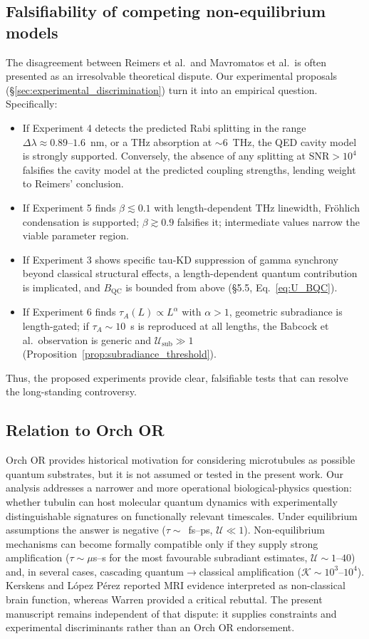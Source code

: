 \documentclass[twocolumn,10pt]{article}
\begin{document}
\subsection{Falsifiability of competing non-equilibrium models}
The disagreement between Reimers et al.\ and Mavromatos et al.\ is often
presented as an irresolvable theoretical dispute. Our experimental
proposals (\S\ref{sec:experimental_discrimination}) turn it into an empirical question.
Specifically:
\begin{itemize}
\item If Experiment 4 detects the predicted Rabi splitting in the
range $\Delta\lambda \approx 0.89\text{--}1.6$~nm, or a THz absorption at
$\sim 6$~THz, the QED cavity model is strongly supported. Conversely, the
absence of any splitting at SNR$>10^4$ falsifies the cavity model at the
predicted coupling strengths, lending weight to Reimers' conclusion.
\item If Experiment 5 finds $\beta\lesssim 0.1$ with length-dependent
THz linewidth, Fr\"ohlich condensation is supported; $\beta\gtrsim 0.9$
falsifies it; intermediate values narrow the viable parameter region.
\item If Experiment 3 shows specific tau-KD suppression of gamma
synchrony beyond classical structural effects, a length-dependent
quantum contribution is implicated, and $B_{\text{QC}}$ is bounded from
above (\S 5.5, Eq.~\ref{eq:U_BQC}).
\item If Experiment 6 finds $\tau_A(L) \propto L^\alpha$ with $\alpha>1$,
geometric subradiance is length-gated; if $\tau_A \sim 10$~s is reproduced
at all lengths, the Babcock et al.\ observation is generic and
$\mathcal{U}_{\text{sub}} \gg 1$ (Proposition~\ref{prop:subradiance_threshold}).
\end{itemize}
Thus, the proposed experiments provide clear, falsifiable tests that
can resolve the long-standing controversy.

\subsection{Relation to Orch OR}
Orch OR \cite{Penrose1994,Hameroff2014} provides historical motivation for
considering microtubules as possible quantum substrates, but it is not assumed
or tested in the present work. Our analysis addresses a narrower and more
operational biological-physics question: whether tubulin can host molecular
quantum dynamics with experimentally distinguishable signatures on functionally
relevant timescales. Under equilibrium assumptions the answer is negative
($\tau\sim$~fs--ps, $\mathcal{U}\ll1$). Non-equilibrium mechanisms can become
formally compatible only if they supply strong amplification
($\tau\sim\mu$s--s for the most favourable subradiant estimates,
$\mathcal{U}\sim1$--$40$) and, in several cases, cascading
quantum$\to$classical amplification ($\mathcal{K}\sim10^3$--$10^4$). Kerskens
and L\'opez P\'erez \cite{Kerskens2022} reported MRI evidence interpreted as
non-classical brain function, whereas Warren \cite{Warren2023} provided a
critical rebuttal. The present manuscript remains independent of that dispute:
it supplies constraints and experimental discriminants rather than an Orch OR
endorsement.
\end{document}
